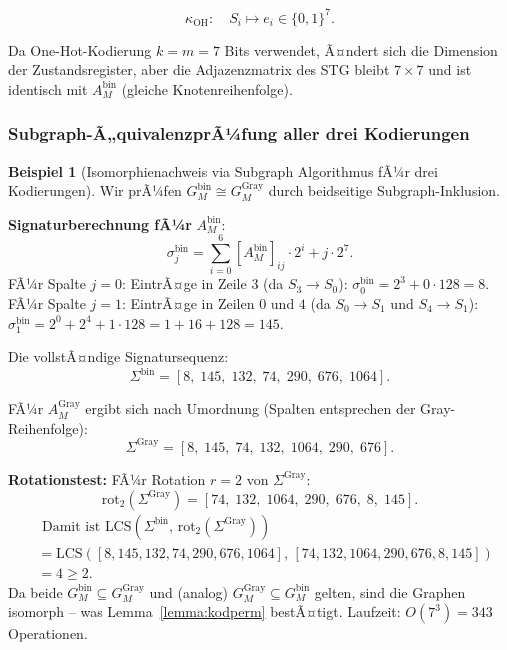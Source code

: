 ﻿\documentclass[a4paper,12pt]{article}
\theoremstyle{definition}
\newtheorem{beispiel}{Beispiel}
\begin{document}
\[
  \kappa_{\text{OH}}:
  \quad S_i \mapsto e_i \in \{0,1\}^7.
\]

Da One-Hot-Kodierung $k = m = 7$ Bits verwendet, Ã¤ndert sich die Dimension der
Zustandsregister, aber die Adjazenzmatrix des STG bleibt $7 \times 7$ und ist identisch
mit $A_M^{\text{bin}}$ (gleiche Knotenreihenfolge).

\subsubsection{Subgraph-Ã„quivalenzprÃ¼fung aller drei Kodierungen}

\begin{beispiel}[Isomorphienachweis via Subgraph Algorithmus fÃ¼r drei Kodierungen]
  \label{bsp:kodzgraph}
  Wir prÃ¼fen $G_M^{\text{bin}} \cong G_M^{\text{Gray}}$ durch beidseitige
  Subgraph-Inklusion.

  \textbf{Signaturberechnung fÃ¼r} $A_M^{\text{bin}}$:
  \[
    \sigma_j^{\text{bin}} = \sum_{i=0}^{6} [A_M^{\text{bin}}]_{ij} \cdot 2^i + j \cdot 2^7.
  \]
  FÃ¼r Spalte $j=0$: EintrÃ¤ge in Zeile $3$ (da $S_3 \to S_0$):
  $\sigma_0^{\text{bin}} = 2^3 + 0 \cdot 128 = 8$.
  FÃ¼r Spalte $j=1$: EintrÃ¤ge in Zeilen $0$ und $4$ (da $S_0 \to S_1$ und $S_4 \to S_1$):
  $\sigma_1^{\text{bin}} = 2^0 + 2^4 + 1 \cdot 128 = 1 + 16 + 128 = 145$.

  Die vollstÃ¤ndige Signatursequenz:
  \[
    \Sigma^{\text{bin}} = [8,\; 145,\; 132,\; 74,\; 290,\; 676,\; 1064].
  \]

  FÃ¼r $A_M^{\text{Gray}}$ ergibt sich nach Umordnung (Spalten entsprechen der
  Gray-Reihenfolge):
  \[
    \Sigma^{\text{Gray}} = [8,\; 145,\; 74,\; 132,\; 1064,\; 290,\; 676].
  \]

  \textbf{Rotationstest:} FÃ¼r Rotation $r = 2$ von $\Sigma^{\text{Gray}}$:
  \[
    \text{rot}_2(\Sigma^{\text{Gray}}) = [74,\; 132,\; 1064,\; 290,\; 676,\; 8,\; 145].
  \]
  \begin{align*}
  	& \text{ Damit ist } \text{LCS}(\Sigma^{\text{bin}},\, \text{rot}_2(\Sigma^{\text{Gray}})) \\
  	&= \text{LCS}([8,145,132,74,290,676,1064],\, [74,132,1064,290,676,8,145]) \\ 
  	&= 4 \geq 2.
  \end{align*}
  Da beide $G_M^{\text{bin}} \subseteq G_M^{\text{Gray}}$ und (analog)
  $G_M^{\text{Gray}} \subseteq G_M^{\text{bin}}$ gelten, sind die Graphen isomorph --
  was Lemma~\ref{lemma:kodperm} bestÃ¤tigt. Laufzeit: $O(7^3) = 343$ Operationen.
\end{beispiel}
\end{document}
